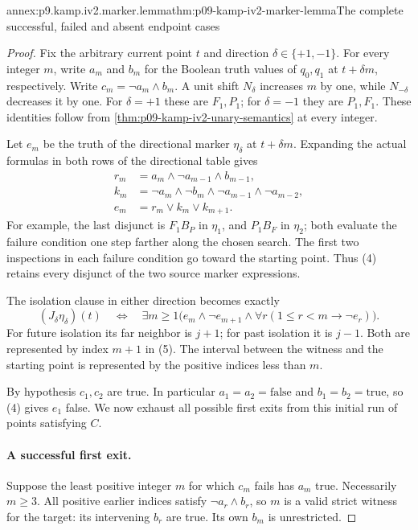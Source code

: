 \begin{annexitem}{annex:p9.kamp.iv2.marker.lemma}{thm:p09-kamp-iv2-marker-lemma}{The complete successful, failed and absent endpoint cases}
\begin{proof}
Fix the arbitrary current point \(t\) and direction
\(\delta\in\{+1,-1\}\). For every integer \(m\),
write \(a_m\) and \(b_m\) for the Boolean truth values
of \(q_0,q_1\) at \(t+\delta m\), respectively.
Write \(c_m=\neg a_m\land b_m\). A unit shift
\(N_\delta\) increases \(m\) by one, while
\(N_{-\delta}\) decreases it by one. For \(\delta=+1\)
these are \(F_1,P_1\); for \(\delta=-1\) they are
\(P_1,F_1\). These identities follow from
\cref{thm:p09-kamp-iv2-unary-semantics} at every integer.

Let \(e_m\) be the truth of the directional marker
\(\eta_\delta\) at \(t+\delta m\). Expanding the
actual formulas in both rows of the directional table gives
\[
\begin{aligned}
 r_m&=a_m\land\neg a_{m-1}\land b_{m-1},\\
 k_m&=\neg a_m\land\neg b_m\land
                         \neg a_{m-1}\land\neg a_{m-2},\\
 e_m&=r_m\lor k_m\lor k_{m+1}.
\end{aligned}
 \tag{4}
\]
For example, the last disjunct is \(F_1B_P\) in
\(\eta_1\), and \(P_1B_F\) in \(\eta_2\);
both evaluate the failure condition one step farther along
the chosen search. The first two inspections in each
failure condition go toward the starting point. Thus (4)
retains every disjunct of the two source marker expressions.

The isolation clause in either direction becomes exactly
\[
 (J_\delta\eta_\delta)(t)
 \quad\Longleftrightarrow\quad
 \exists m\geq1\bigl(e_m\land\neg e_{m+1}\land
             \forall r(1\leq r<m\to\neg e_r)\bigr).
 \tag{5}
\]
For future isolation its far neighbor is \(j+1\); for
past isolation it is \(j-1\). Both are represented by
index \(m+1\) in (5). The interval between the witness
and the starting point is represented by the positive
indices less than \(m\).

By hypothesis \(c_1,c_2\) are true. In particular
\(a_1=a_2=\text{false}\) and
\(b_1=b_2=\text{true}\), so (4) gives \(e_1\)
false. We now exhaust all possible first exits from this
initial run of points satisfying \(C\).

\paragraph{A successful first exit.}
Suppose the least positive integer \(m\) for which
\(c_m\) fails has \(a_m\) true. Necessarily
\(m\geq3\). All positive earlier indices satisfy
\(\neg a_r\land b_r\), so \(m\) is a valid
strict witness for the target: its intervening \(b_r\)
are true. Its own \(b_m\) is unrestricted.


\end{proof}
\end{annexitem}
